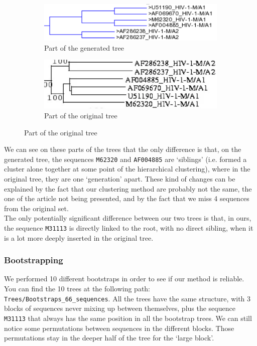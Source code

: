 \documentclass[english,13pt,a4paper]{article}
\theoremstyle{definition}
\theoremstyle{remark}
\theoremstyle{defstyle}
\begin{document}
\begin{figure}[H]
    \centering
    \begin{subfigure}{0.48\textwidth}
        \centering
        \includegraphics[width=\textwidth]{Images/Example_66.png}
        \caption{Part of the generated tree}
    \end{subfigure}
    \hfill
    \begin{subfigure}{0.48\textwidth}
        \centering
        \includegraphics[width=\textwidth]{Images/Example_Orig66.png}
        \caption{Part of the original tree}
    \end{subfigure}
\end{figure}

We can see on these parts of the trees that the only difference is that, on the generated tree, the sequences \texttt{M62320} and \texttt{AF004885} are `siblings' (i.e. formed a cluster alone together at some point of the hierarchical clustering), where in the original tree, they are one `generation' apart. These kind of changes can be explained by the fact that our clustering method are probably not the same, the one of the article not being presented, and by the fact that we miss 4 sequences from the original set.\\

The only potentially significant difference between our two trees is that, in ours, the sequence \texttt{M31113} is directly linked to the root, with no direct sibling, when it is a lot more deeply inserted in the original tree. 

\subsubsection{Bootstrapping}

We performed 10 different bootstraps in order to see if our method is reliable. You can find the 10 trees at the following path: \texttt{Trees/Bootstraps\_66\_sequences}. All the trees have the same structure, with 3 blocks of sequences never mixing up between themselves, plus the sequence \texttt{M31113} that always has the same position in all the bootstrap trees. We can still notice some permutations between sequences in the different blocks. Those permutations stay in the deeper half of the tree for the `large block'.
\end{document}
